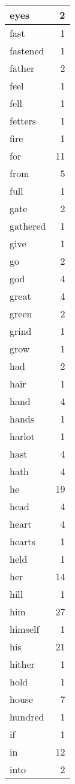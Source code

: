 \begin{center}
\begin{longtable}{l|r}
eyes & 2\\ \hline 
fast & 1\\ \hline 
fastened & 1\\ \hline 
father & 2\\ \hline 
feel & 1\\ \hline 
fell & 1\\ \hline 
fetters & 1\\ \hline 
fire & 1\\ \hline 
for & 11\\ \hline 
from & 5\\ \hline 
full & 1\\ \hline 
gate & 2\\ \hline 
gathered & 1\\ \hline 
give & 1\\ \hline 
go & 2\\ \hline 
god & 4\\ \hline 
great & 4\\ \hline 
green & 2\\ \hline 
grind & 1\\ \hline 
grow & 1\\ \hline 
had & 2\\ \hline 
hair & 1\\ \hline 
hand & 4\\ \hline 
hands & 1\\ \hline 
harlot & 1\\ \hline 
hast & 4\\ \hline 
hath & 4\\ \hline 
he & 19\\ \hline 
head & 4\\ \hline 
heart & 4\\ \hline 
hearts & 1\\ \hline 
held & 1\\ \hline 
her & 14\\ \hline 
hill & 1\\ \hline 
him & 27\\ \hline 
himself & 1\\ \hline 
his & 21\\ \hline 
hither & 1\\ \hline 
hold & 1\\ \hline 
house & 7\\ \hline 
hundred & 1\\ \hline 
if & 1\\ \hline 
in & 12\\ \hline 
into & 2\\ \hline 

\end{longtable}
\end{center}
